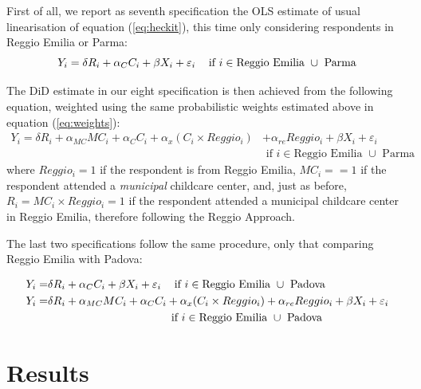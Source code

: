 \documentclass[12pt]{article}
\begin{document}
First of all, we report as seventh specification the OLS estimate of usual linearisation of equation (\ref{eq:heckit}), this time only considering respondents in Reggio Emilia or Parma:
\begin{equation}
Y_{i} = \delta R_{i} + \alpha_{C} C_{i} + \beta X_{i} + \varepsilon_{i}    \hspace{2ex} \text{ if } i \in \text{Reggio Emilia } \cup \text{ Parma} \label{eq7:OLSrepr}
\end{equation}

\medskip

The DiD estimate in our eight specification is then achieved from the following equation, weighted using the same probabilistic weights estimated above in equation (\ref{eq:weights}):
\begin{align}
Y_{i} = \delta R_{i} + \alpha_{MC} MC_{i} + \alpha_{C} C_{i} + \alpha_{x} (C_{i} \times Reggio_{i}) &+  \alpha_{re} Reggio_{i} + \beta X_{i} + \varepsilon_{i} \nonumber \\
   & \text{ if } i \in \text{Reggio Emilia } \cup \text{ Parma} \label{eq8:didpr}
\end{align} 
%
where $Reggio_{i}=1$ if the respondent is from Reggio Emilia, $MC_{i}==1$ if the respondent attended a \textit{municipal} childcare center, and, just as before, $R_{i}=MC_{i} \times Reggio_{i}=1$ if the respondent attended a municipal childcare center in Reggio Emilia, therefore following the Reggio Approach.

\medskip

The last two specifications follow the same procedure, only that comparing Reggio Emilia with Padova:

\begin{align}
Y_{i} =& \delta R_{i} + \alpha_{C} C_{i} + \beta X_{i} + \varepsilon_{i}    \hspace{2ex} \text{ if } i \in \text{Reggio Emilia } \cup \text{ Padova} \label{eq9:OLSrepd} \\
Y_{i} =& \delta R_{i} + \alpha_{MC} MC_{i} + \alpha_{C} C_{i} + \alpha_{x} (C_{i} \times Reggio_{i}) +  \alpha_{re} Reggio_{i} + \beta X_{i} + \varepsilon_{i} \nonumber \\
& \hspace{25ex} \text{ if } i \in \text{Reggio Emilia } \cup \text{ Padova} \label{eq10:didpd}
\end{align}


\section{Results}
\end{document}
